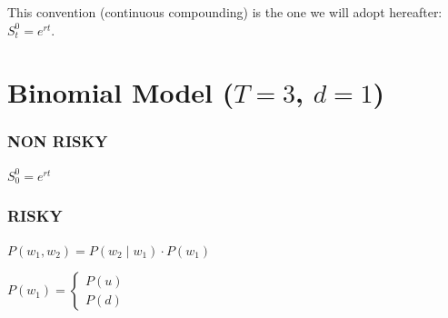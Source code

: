 This convention (continuous compounding) is the one we will adopt hereafter: $S^0_t = e^{rt}$.

\section{Binomial Model ($T=3$, $d=1$)}

\subsubsection*{NON RISKY}
$S_0^0 = e^{rt}$

\subsubsection*{RISKY}
$P(w_1, w_2) = P(w_2 \mid w_1) \cdot P(w_1)$

$P(w_1) = \begin{cases}
P(u) \\
P(d)
\end{cases}$

\vspace{1cm}

